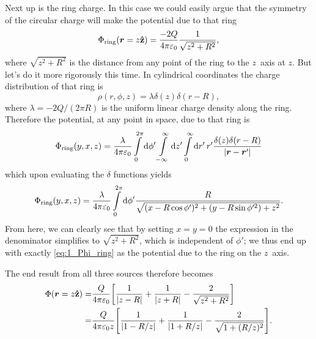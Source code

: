 \documentclass[11pt,letter, swedish, english
]{article}
\let\oldint\int
\renewcommand{\int}{\oldint\limits}
\newcommand{\enaught}{\ensuremath\varepsilon_0}
\begin{document}
Next up is the ring charge. In this case we could easily argue that
the symmetry of the circular charge will make the potential due to
that ring 
\begin{equation}\label{eq:1_Phi_ring}
\Phi_\text{ring}(\vb*r=z\vu{z})=\frac{-2Q}{4\pi\enaught}
\frac{1}{\sqrt{z^2+R^2}},
\end{equation}
where $\sqrt{z^2+R^2}$ is the distance from any point of the ring to
the $z$~axis at $z$. But let's do it more rigorously this time. In
cylindrical coordinates the charge distribution of that ring is
\begin{equation}
\rho(r, \phi, z)=\lambda \delta(z)\delta(r-R),
\end{equation}
where $\lambda=-2Q/(2\pi R)$ is the uniform linear charge density
along the ring. 
Therefore the potential, at any point in space, due to that ring is
\begin{equation}
\Phi_\text{ring}(y, x, z)=\frac{\lambda}{4\pi\enaught}
\int_0^{2\pi}\rd\phi'\int_{-\infty}^\infty\rd{z'}\int_0^\infty\rd{r'}\,r'
\frac{\delta(z)\delta(r-R)}{\abs{\vb*r-\vb*r'}}
\end{equation}
which upon evaluating the $\delta$ functions yields
\begin{equation}
\Phi_\text{ring}(y, x, z)
= \frac{\lambda}{4\pi\enaught} \int_0^{2\pi}\rd\phi'
\frac{R}{\sqrt{(x-R\cos\phi')^2+(y-R\sin\phi'^2)+z^2}}.
\end{equation}
From here, we can clearly see that by setting $x=y=0$ the expression
in the denominator simplifies to $\sqrt{z^2+R^2}$, which is
independent of $\phi'$; we thus end up with exactly
\eqref{eq:1_Phi_ring} as the potential due to the ring on the
$z$~axis.  

The end result from all three sources therefore becomes
\begin{align}\label{eq:1_Phi_a}
\Phi(\vb*r=z\vu{z})=&\frac{Q}{4\pi\enaught}
\qty[\frac{1}{\abs{z-R}}+\frac{1}{\abs{z+R}}
-\frac{2}{\sqrt{z^2+R^2}}]
\\\label{eq:1_Phi_b}
=&\frac{Q}{4\pi\enaught z}
\qty[\frac{1}{\abs{1-R/z}}+\frac{1}{\abs{1+R/z}}
-\frac{2}{\sqrt{1+(R/z)^2}}].
\end{align}
\end{document}
